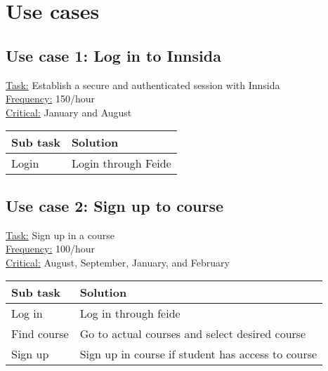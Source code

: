 \section{Use cases}

\subsection*{Use case 1: Log in to Innsida}

\underline{Task:} Establish a secure and authenticated session with Innsida\\
\underline{Frequency:} 150/hour\\
\underline{Critical:} January and August 

\begin{tabularx}{\textwidth}{|l|X|}
  \hline
  Sub task & Solution \\ \hline
  Login & Login through Feide \\ \hline
\end{tabularx}

\subsection*{Use case 2: Sign up to course}

\underline{Task:} Sign up in a course\\
\underline{Frequency:} 100/hour\\
\underline{Critical:} August, September, January, and February

\begin{tabularx}{\textwidth}{|l|X|}
  \hline
  Sub task & Solution \\ \hline
  Log in & Log in through feide \\ \hline
  Find course & Go to actual courses and select desired course \\ \hline
  Sign up & Sign up in course if student has access to course \\ \hline
\end{tabularx}
